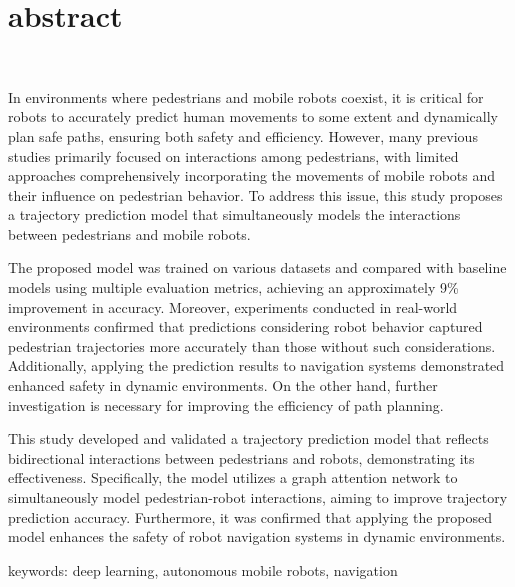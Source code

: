 \chapter*{abstract}
\thispagestyle{empty}
%
\vspace{-30pt}
\begin{center}
  \scalebox{1.2}{Pedestrian Position Prediction Using Deep Learning for Mobile Robot}\\
  \scalebox{1.2}{and Its Application to Navigation}
\end{center}
\vspace{1.0zh}
%
In environments where pedestrians and mobile robots coexist, it is critical for robots to accurately predict human movements to some extent and dynamically plan safe paths, ensuring both safety and efficiency. However, many previous studies primarily focused on interactions among pedestrians, with limited approaches comprehensively incorporating the movements of mobile robots and their influence on pedestrian behavior. To address this issue, this study proposes a trajectory prediction model that simultaneously models the interactions between pedestrians and mobile robots.

The proposed model was trained on various datasets and compared with baseline models using multiple evaluation metrics, achieving an approximately 9\% improvement in accuracy. Moreover, experiments conducted in real-world environments confirmed that predictions considering robot behavior captured pedestrian trajectories more accurately than those without such considerations. Additionally, applying the prediction results to navigation systems demonstrated enhanced safety in dynamic environments. On the other hand, further investigation is necessary for improving the efficiency of path planning.

This study developed and validated a trajectory prediction model that reflects bidirectional interactions between pedestrians and robots, demonstrating its effectiveness. Specifically, the model utilizes a graph attention network to simultaneously model pedestrian-robot interactions, aiming to improve trajectory prediction accuracy. Furthermore, it was confirmed that applying the proposed model enhances the safety of robot navigation systems in dynamic environments.

\begin{flushleft}
keywords: deep learning, autonomous mobile robots, navigation
\end{flushleft}